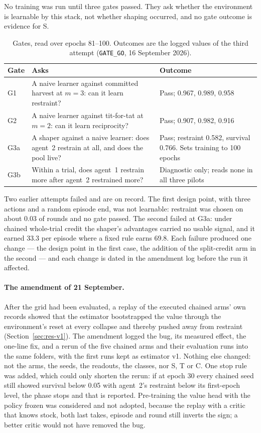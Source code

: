 No training was run until three gates passed.
They ask whether the environment is learnable by this stack, not whether
shaping occurred, and no gate outcome is evidence for S.

\begin{table}[ht]
\centering\small
\caption{Gates, read over epochs 81--100. Outcomes are the logged values of
  the third attempt (\texttt{GATE\_GO}, 16 September 2026).}
\label{tab:gates}
\begin{tabularx}{\textwidth}{l>{\raggedright\arraybackslash}p{5.4cm}X}
\toprule
Gate & Asks & Outcome \\
\midrule
G1 & A naive learner against committed harvest at \(m=3\): can it learn restraint? & Pass; 0.967, 0.989, 0.958 \\
G2 & A naive learner against tit-for-tat at \(m=2\): can it learn reciprocity? & Pass; 0.907, 0.982, 0.916 \\
G3a & A shaper against a naive learner: does agent~2 restrain at all, and does the pool live? & Pass; restraint 0.582, survival 0.766. Sets training to 100 epochs \\
G3b & Within a trial, does agent~1 restrain more after agent~2 restrained more? & Diagnostic only; reads none in all three pilots \\
\bottomrule
\end{tabularx}
\end{table}

Two earlier attempts failed and are on record.
The first design point, with three actions and a random episode end, was
not learnable: restraint was chosen on about 0.03 of rounds and no gate
passed.
The second failed at G3a: under chained whole-trial credit the shaper's
advantages carried no usable signal, and it earned 33.3 per episode where a
fixed rule earns 69.8.
Each failure produced one change --- the design point in the first case, the
addition of the split-credit arm in the second --- and each change is dated
in the amendment log before the run it affected.

\paragraph{The amendment of 21 September.}
After the grid had been evaluated, a replay of the executed chained arms'
own records showed that the estimator bootstrapped the value through the
environment's reset at every collapse and thereby pushed away from
restraint (Section~\ref{sec:res-v1}).
The amendment logged the bug, its measured effect, the one-line fix, and a
rerun of the five chained arms and their evaluation runs into the same
folders, with the first runs kept as estimator v1.
Nothing else changed: not the arms, the seeds, the readouts, the classes,
nor S, T or C.
One stop rule was added, which could only shorten the rerun: if at epoch 30
every chained seed still showed survival below 0.05 with agent~2's
restraint below its first-epoch level, the phase stops and that is
reported.
Pre-training the value head with the policy frozen was considered and not
adopted, because the replay with a critic that knows stock, both last
takes, episode and round still inverts the sign; a better critic would not
have removed the bug.

